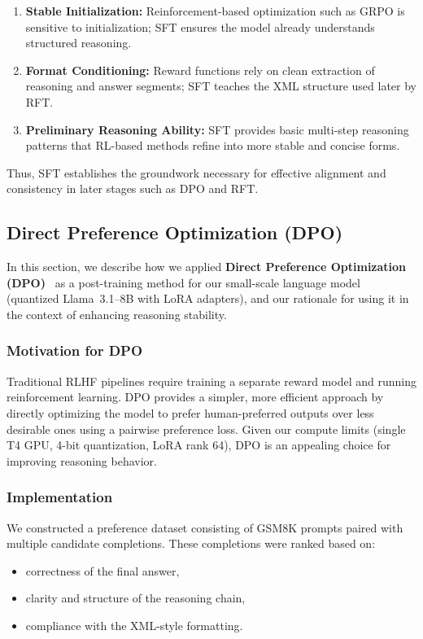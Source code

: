 \documentclass{article}
\begin{document}
\begin{enumerate}
    \item \textbf{Stable Initialization:} Reinforcement-based optimization such as GRPO is sensitive to initialization; SFT ensures the model already understands structured reasoning.
    \item \textbf{Format Conditioning:} Reward functions rely on clean extraction of reasoning and answer segments; SFT teaches the XML structure used later by RFT.
    \item \textbf{Preliminary Reasoning Ability:} SFT provides basic multi-step reasoning patterns that RL-based methods refine into more stable and concise forms.
\end{enumerate}

Thus, SFT establishes the groundwork necessary for effective alignment and consistency in later stages such as DPO and RFT.

\subsection{Direct Preference Optimization (DPO)}

In this section, we describe how we applied \textbf{Direct Preference Optimization (DPO)}~\cite{rafailov2023dpo} as a post-training method for our small-scale language model (quantized Llama~3.1--8B with LoRA adapters), and our rationale for using it in the context of enhancing reasoning stability.

\subsubsection*{Motivation for DPO}

Traditional RLHF pipelines require training a separate reward model and running reinforcement learning. DPO provides a simpler, more efficient approach by directly optimizing the model to prefer human-preferred outputs over less desirable ones using a pairwise preference loss. Given our compute limits (single T4 GPU, 4-bit quantization, LoRA rank 64), DPO is an appealing choice for improving reasoning behavior.

\subsubsection*{Implementation}

We constructed a preference dataset consisting of GSM8K prompts paired with multiple candidate completions. These completions were ranked based on:
\begin{itemize}
    \item correctness of the final answer,
    \item clarity and structure of the reasoning chain,
    \item compliance with the XML-style formatting.
\end{itemize}
\end{document}
